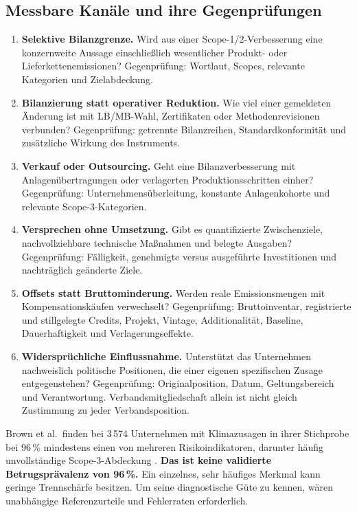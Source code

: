 \documentclass[11pt,a4paper]{article}
\begin{document}
\subsection{Messbare Kanäle und ihre Gegenprüfungen}
\begin{enumerate}
\item \textbf{Selektive Bilanzgrenze.} Wird aus einer Scope-1/2-Verbesserung eine konzernweite Aussage einschließlich wesentlicher Produkt- oder Lieferkettenemissionen? Gegenprüfung: Wortlaut, Scopes, relevante Kategorien und Zielabdeckung.
\item \textbf{Bilanzierung statt operativer Reduktion.} Wie viel einer gemeldeten Änderung ist mit LB/MB-Wahl, Zertifikaten oder Methodenrevisionen verbunden? Gegenprüfung: getrennte Bilanzreihen, Standardkonformität und zusätzliche Wirkung des Instruments.
\item \textbf{Verkauf oder Outsourcing.} Geht eine Bilanzverbesserung mit Anlagenübertragungen oder verlagerten Produktionsschritten einher? Gegenprüfung: Unternehmensüberleitung, konstante Anlagenkohorte und relevante Scope-3-Kategorien.
\item \textbf{Versprechen ohne Umsetzung.} Gibt es quantifizierte Zwischenziele, nachvollziehbare technische Maßnahmen und belegte Ausgaben? Gegenprüfung: Fälligkeit, genehmigte versus ausgeführte Investitionen und nachträglich geänderte Ziele.
\item \textbf{Offsets statt Bruttominderung.} Werden reale Emissionsmengen mit Kompensationskäufen verwechselt? Gegenprüfung: Bruttoinventar, registrierte und stillgelegte Credits, Projekt, Vintage, Additionalität, Baseline, Dauerhaftigkeit und Verlagerungseffekte.
\item \textbf{Widersprüchliche Einflussnahme.} Unterstützt das Unternehmen nachweislich politische Positionen, die einer eigenen spezifischen Zusage entgegenstehen? Gegenprüfung: Originalposition, Datum, Geltungsbereich und Verantwortung. Verbandsmitgliedschaft allein ist nicht gleich Zustimmung zu jeder Verbandsposition.
\end{enumerate}

Brown et al.\ finden bei 3\,574 Unternehmen mit Klimazusagen in ihrer Stichprobe bei 96\,\% mindestens einen von mehreren Risikoindikatoren, darunter häufig unvollständige Scope-3-Abdeckung \cite{brown2026}. \textbf{Das ist keine validierte Betrugsprävalenz von 96\,\%.} Ein einzelnes, sehr häufiges Merkmal kann geringe Trennschärfe besitzen. Um seine diagnostische Güte zu kennen, wären unabhängige Referenzurteile und Fehlerraten erforderlich.
\end{document}
